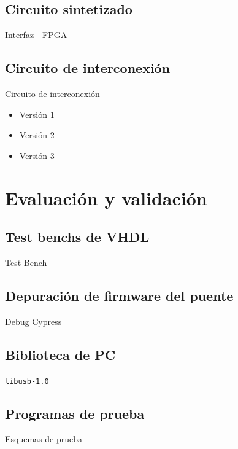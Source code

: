 \documentclass[11pt,a4paper]{beamer}
\begin{document}
		\subsection{Circuito sintetizado}
			\begin{frame}{Interfaz - FPGA}
				
			\end{frame}
		\subsection{Circuito de interconexión}
			\begin{frame}{Circuito de interconexión}
				\begin{itemize}
					\item Versión 1
					\item Versión 2
					\item Versión 3
				\end{itemize}
			\end{frame}
	\section{Evaluación y validación}
		\subsection{Test benchs de VHDL}
			\begin{frame}{Test Bench}
				
			\end{frame}
		\subsection{Depuración de firmware del puente}
			\begin{frame}{Debug Cypress}
				
			\end{frame}
		\subsection{Biblioteca de PC}
			\begin{frame}{\texttt{libusb-1.0}}
				
			\end{frame}
		\subsection{Programas de prueba}
			\begin{frame}{Esquemas de prueba}
				
			\end{frame}
\end{document}
